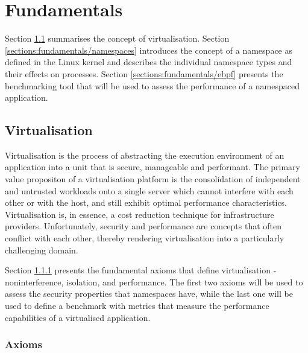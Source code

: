 \chapter{Fundamentals}
\label{ch:fundamentals}

Section \ref{sections:fundamentals/virtualisation} summarises the concept of virtualisation.
Section \ref{sections:fundamentals/namespaces} introduces the concept of a namespace as defined 
in the Linux kernel and describes the individual namespace types and their effects on processes. 
Section \ref{sections:fundamentals/ebpf} presents the benchmarking tool 
that will be used to assess the performance of a namespaced application.

\section{Virtualisation}
\label{sections:fundamentals/virtualisation}
Virtualisation is the process of abstracting the execution environment of an application into 
a unit that is secure, manageable and performant. The primary value propositon of a virtualisation 
platform is the consolidation of independent and untrusted workloads onto a single 
server which cannot interfere with each other or with the host, and still exhibit optimal 
performance characteristics. Virtualisation is, in essence, a cost reduction technique for 
infrastructure providers. Unfortunately, security and performance are concepts that often conflict 
with each other, thereby rendering virtualisation into a particularly challenging domain.

Section \ref{sections:fundamentals/virtualisation/axioms} presents the fundamental axioms 
that define virtualisation - noninterference, isolation, and performance.
The first two axioms will be used to assess the security properties
that namespaces have, while the last one will be used to define a benchmark with metrics that 
measure the performance capabilities of a virtualised application. 

\subsection{Axioms}
\label{sections:fundamentals/virtualisation/axioms}
